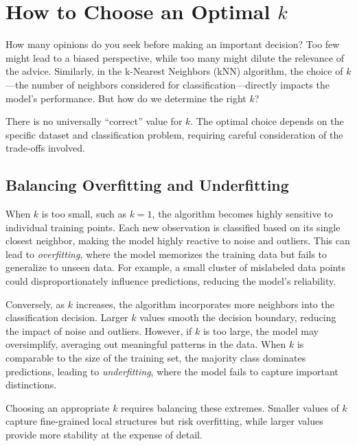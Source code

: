 \documentclass[
]{book}
\theoremstyle{definition}
\theoremstyle{definition}
\theoremstyle{definition}
\theoremstyle{definition}
\theoremstyle{remark}
\begin{document}
\section{\texorpdfstring{How to Choose an Optimal \(k\)}{How to Choose an Optimal k}}\label{how-to-choose-an-optimal-k}

How many opinions do you seek before making an important decision? Too few might lead to a biased perspective, while too many might dilute the relevance of the advice. Similarly, in the k-Nearest Neighbors (kNN) algorithm, the choice of \(k\)---the number of neighbors considered for classification---directly impacts the model's performance. But how do we determine the right \(k\)?

There is no universally ``correct'' value for \(k\). The optimal choice depends on the specific dataset and classification problem, requiring careful consideration of the trade-offs involved.

\subsection*{Balancing Overfitting and Underfitting}\label{balancing-overfitting-and-underfitting}

When \(k\) is too small, such as \(k = 1\), the algorithm becomes highly sensitive to individual training points. Each new observation is classified based on its single closest neighbor, making the model highly reactive to noise and outliers. This can lead to \emph{overfitting}, where the model memorizes the training data but fails to generalize to unseen data. For example, a small cluster of mislabeled data points could disproportionately influence predictions, reducing the model's reliability.

Conversely, as \(k\) increases, the algorithm incorporates more neighbors into the classification decision. Larger \(k\) values smooth the decision boundary, reducing the impact of noise and outliers. However, if \(k\) is too large, the model may oversimplify, averaging out meaningful patterns in the data. When \(k\) is comparable to the size of the training set, the majority class dominates predictions, leading to \emph{underfitting}, where the model fails to capture important distinctions.

Choosing an appropriate \(k\) requires balancing these extremes. Smaller values of \(k\) capture fine-grained local structures but risk overfitting, while larger values provide more stability at the expense of detail.
\end{document}
